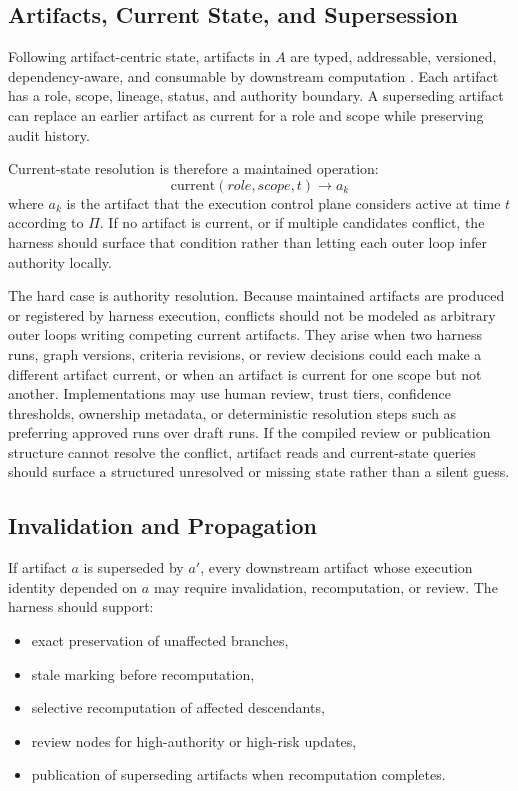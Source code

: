\documentclass{article}
\begin{document}
\subsection{Artifacts, Current State, and Supersession}

Following artifact-centric state, artifacts in $A$ are typed, addressable, versioned, dependency-aware, and consumable by downstream computation \cite{rosen2026artifacts}. Each artifact has a role, scope, lineage, status, and authority boundary. A superseding artifact can replace an earlier artifact as current for a role and scope while preserving audit history.

Current-state resolution is therefore a maintained operation:
\begin{equation}
\mathrm{current}(role, scope, t) \rightarrow a_k
\end{equation}
where $a_k$ is the artifact that the execution control plane considers active at time $t$ according to $\Pi$. If no artifact is current, or if multiple candidates conflict, the harness should surface that condition rather than letting each outer loop infer authority locally.

The hard case is authority resolution. Because maintained artifacts are produced or registered by harness execution, conflicts should not be modeled as arbitrary outer loops writing competing current artifacts. They arise when two harness runs, graph versions, criteria revisions, or review decisions could each make a different artifact current, or when an artifact is current for one scope but not another. Implementations may use human review, trust tiers, confidence thresholds, ownership metadata, or deterministic resolution steps such as preferring approved runs over draft runs. If the compiled review or publication structure cannot resolve the conflict, artifact reads and current-state queries should surface a structured unresolved or missing state rather than a silent guess.

\subsection{Invalidation and Propagation}

If artifact $a$ is superseded by $a'$, every downstream artifact whose execution identity depended on $a$ may require invalidation, recomputation, or review. The harness should support:
\begin{itemize}[leftmargin=*]
\item exact preservation of unaffected branches,
\item stale marking before recomputation,
\item selective recomputation of affected descendants,
\item review nodes for high-authority or high-risk updates,
\item publication of superseding artifacts when recomputation completes.
\end{itemize}
\end{document}

